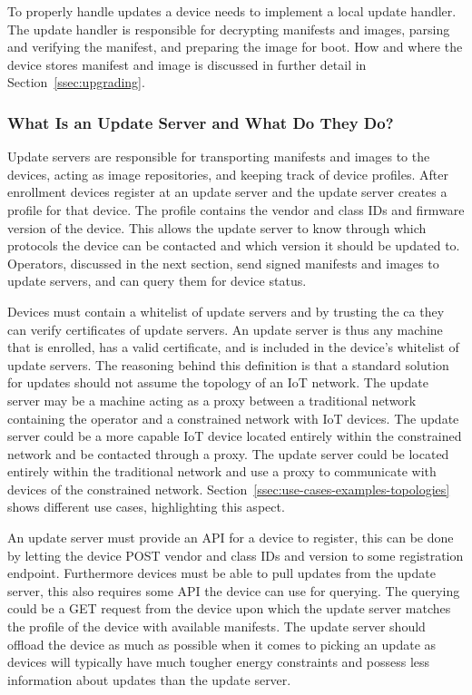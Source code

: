 \documentclass[0-thesis.tex]{subfiles}
\begin{document}
To properly handle updates a device needs to implement a local update handler. The update
handler is responsible for decrypting manifests and images, parsing and verifying the
manifest, and preparing the image for boot. How and where the device stores manifest and
image is discussed in further detail in Section~\ref{ssec:upgrading}.

\subsubsection{What Is an Update Server and What Do They Do?}
\label{sssec:what-is-an-update-server}
Update servers are responsible for transporting manifests and images to the devices,
acting as image repositories, and keeping track of device profiles. After enrollment
devices register at an update server and the update server creates a profile for that
device. The profile contains the vendor and class IDs and firmware version of the device.
This allows the update server to know through which protocols the device can be contacted
and which version it should be updated to. Operators, discussed in the next section, send
signed manifests and images to update servers, and can query them for device status.

Devices must contain a whitelist of update servers and by trusting the \gls{ca} they can
verify certificates of update servers. An update server is thus any machine that is
enrolled, has a valid certificate, and is included in the device's whitelist of update
servers. The reasoning behind this definition is that a standard solution for updates
should not assume the topology of an IoT network. The update server may be a machine
acting as a proxy between a traditional network containing the operator and a constrained
network with IoT devices. The update server could be a more capable IoT device located
entirely within the constrained network and be contacted through a proxy. The update
server could be located entirely within the traditional network and use a proxy to
communicate with devices of the constrained network.
Section~\ref{ssec:use-cases-examples-topologies} shows different use cases, highlighting
this aspect.

An update server must provide an API for a device to register, this can be done by letting
the device POST vendor and class IDs and version to some registration endpoint.
Furthermore devices must be able to pull updates from the update server, this also
requires some API the device can use for querying. The querying could be a GET request
from the device upon which the update server matches the profile of the device with
available manifests. The update server should offload the device as much as possible when
it comes to picking an update as devices will typically have much tougher energy
constraints and possess less information about updates than the update server.
\end{document}
